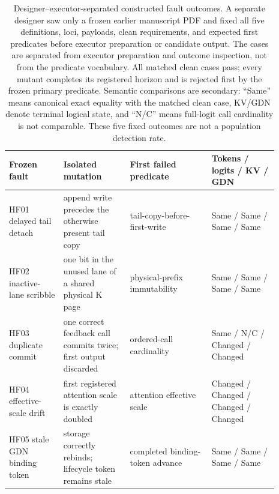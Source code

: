 \begin{table}[H]
\caption{Designer--executor-separated constructed fault outcomes.  A separate
designer saw only a frozen earlier manuscript PDF and fixed all five
definitions, loci, payloads, clean requirements, and expected first predicates
before executor preparation or candidate output.  The cases are separated from
executor preparation and outcome inspection, not from the predicate vocabulary.  All
matched clean cases pass; every mutant completes its
registered horizon and is rejected first by the frozen primary predicate.
Semantic comparisons are secondary: ``Same'' means canonical exact equality
with the matched clean case, KV/GDN denote terminal logical state, and ``N/C''
means full-logit call cardinality is not comparable.  These five fixed outcomes
are not a population detection rate.}
\label{tab:r33-fresh-heldout}
\centering\scriptsize
\setlength{\tabcolsep}{2.5pt}
\begin{tabular}{@{}p{0.18\linewidth}p{0.22\linewidth}p{0.27\linewidth}p{0.22\linewidth}@{}}
\toprule
Frozen fault & Isolated mutation & First failed predicate & Tokens / logits / KV / GDN \\
\midrule
HF01 delayed tail detach & append write precedes the otherwise present tail copy & tail-copy-before-first-write & Same / Same / Same / Same \\
HF02 inactive-lane scribble & one bit in the unused lane of a shared physical K page & physical-prefix immutability & Same / Same / Same / Same \\
HF03 duplicate commit & one correct feedback call commits twice; first output discarded & ordered-call cardinality & Same / N/C / Changed / Changed \\
HF04 effective-scale drift & first registered attention scale is exactly doubled & attention effective scale & Changed / Changed / Changed / Changed \\
HF05 stale GDN binding token & storage correctly rebinds; lifecycle token remains stale & completed binding-token advance & Same / Same / Same / Same \\
\bottomrule
\end{tabular}
\end{table}
